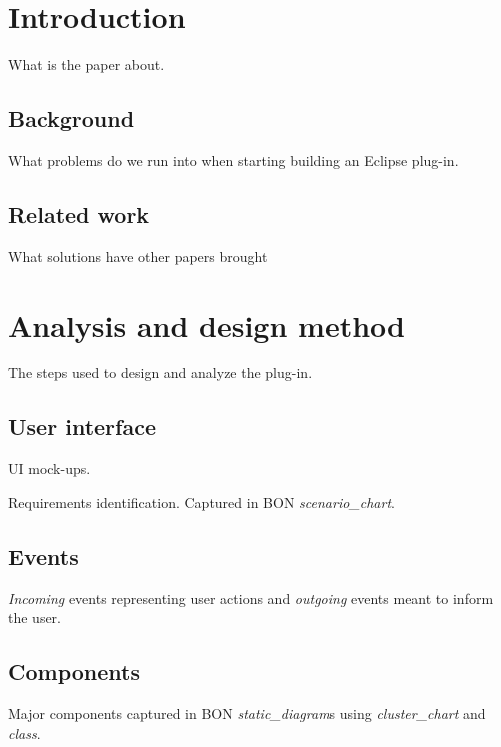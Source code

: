 \documentclass[conference]{IEEEtran}
\begin{document}
%
\IEEEpeerreviewmaketitle


\section{Introduction}
What is the paper about.


%
\subsection{Background}
What problems do we run into when starting building an Eclipse plug-in.



%
\subsection{Related work}
What solutions have other papers brought


\section{Analysis and design method}
The steps used to design and analyze the plug-in.


%
\subsection{User interface}
UI mock-ups. 


Requirements identification. Captured in BON \emph{scenario\_chart}.

%
\subsection{Events}
\emph{Incoming} events representing user actions and \emph{outgoing} events meant to inform the user.


%
\subsection{Components}
Major components captured in BON \emph{static\_diagram}s using \emph{cluster\_chart} and \emph{class}.
\end{document}
